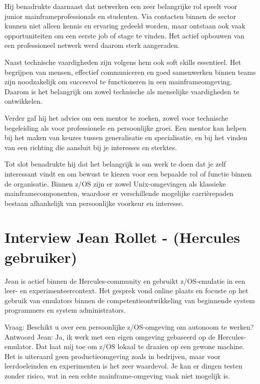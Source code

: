 Hij benadrukte daarnaast dat netwerken een zeer belangrijke rol speelt voor junior mainframeprofessionals en studenten. Via contacten binnen de sector kunnen niet alleen kennis en ervaring gedeeld worden, maar ontstaan ook vaak opportuniteiten om een eerste job of stage te vinden. Het actief opbouwen van een professioneel netwerk werd daarom sterk aangeraden.

Naast technische vaardigheden zijn volgens hem ook soft skills essentieel. Het begrijpen van mensen, effectief communiceren en goed samenwerken binnen teams zijn noodzakelijk om succesvol te functioneren in een mainframeomgeving. Daarom is het belangrijk om zowel technische als menselijke vaardigheden te ontwikkelen.

Verder gaf hij het advies om een mentor te zoeken, zowel voor technische begeleiding als voor professionele en persoonlijke groei. Een mentor kan helpen bij het maken van keuzes tussen generalisatie en specialisatie, en bij het vinden van een richting die aansluit bij je interesses en sterktes.

Tot slot benadrukte hij dat het belangrijk is om werk te doen dat je zelf interessant vindt en om bewust te kiezen voor een bepaalde rol of functie binnen de organisatie. Binnen z/OS zijn er zowel Unix-omgevingen als klassieke mainframecomponenten, waardoor er verschillende mogelijke carrièrepaden bestaan afhankelijk van persoonlijke voorkeur en interesse.

\section{Interview Jean Rollet - (Hercules gebruiker)}

Jean is actief binnen de Hercules-community en gebruikt z/OS-emulatie in een leer- en experimenteercontext. Het gesprek vond online plaats en focuste op het gebruik van emulators binnen de competentieontwikkeling van beginnende system programmers en system administrators.

{Vraag: Beschikt u over een persoonlijke z/OS-omgeving om autonoom te werken?} \\
{Antwoord Jean:} Ja, ik werk met een eigen omgeving gebaseerd op de Hercules-emulator. Dat laat mij toe om z/OS lokaal te draaien op een gewone machine. Het is uiteraard geen productieomgeving zoals in bedrijven, maar voor leerdoeleinden en experimenten is het zeer waardevol. Je kan er dingen testen zonder risico, wat in een echte mainframe-omgeving vaak niet mogelijk is.

